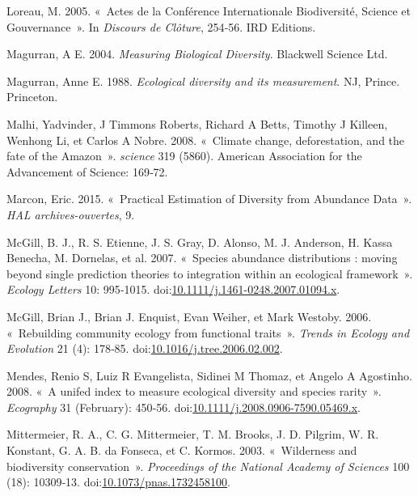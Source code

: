 \documentclass[11pt,french,A4paper,extrafontsizes,onecolumn,openright]{memoir}
\begin{document}
\hypertarget{ref-Loreau2005}{}
Loreau, M. 2005. «~Actes de la Conférence Internationale Biodiversité,
Science et Gouvernance~». In \emph{Discours de Clôture}, 254‑56. IRD
Editions.

\hypertarget{ref-Magurran2004}{}
Magurran, A E. 2004. \emph{Measuring Biological Diversity}. Blackwell
Science Ltd.

\hypertarget{ref-Magurran1988}{}
Magurran, Anne E. 1988. \emph{Ecological diversity and its measurement}.
NJ, Prince. Princeton.

\hypertarget{ref-Malhi2008}{}
Malhi, Yadvinder, J Timmons Roberts, Richard A Betts, Timothy J Killeen,
Wenhong Li, et Carlos A Nobre. 2008. «~Climate change, deforestation,
and the fate of the Amazon~». \emph{science} 319 (5860). American
Association for the Advancement of Science: 169‑72.

\hypertarget{ref-Marcon2015b}{}
Marcon, Eric. 2015. «~Practical Estimation of Diversity from Abundance
Data~». \emph{HAL archives-ouvertes}, 9.

\hypertarget{ref-McGill2007}{}
McGill, B. J., R. S. Etienne, J. S. Gray, D. Alonso, M. J. Anderson, H.
Kassa Benecha, M. Dornelas, et al. 2007. «~Species abundance
distributions : moving beyond single prediction theories to integration
within an ecological framework~». \emph{Ecology Letters} 10: 995‑1015.
doi:\href{https://doi.org/10.1111/j.1461-0248.2007.01094.x}{10.1111/j.1461-0248.2007.01094.x}.

\hypertarget{ref-McGill2006}{}
McGill, Brian J., Brian J. Enquist, Evan Weiher, et Mark Westoby. 2006.
«~Rebuilding community ecology from functional traits~». \emph{Trends in
Ecology and Evolution} 21 (4): 178‑85.
doi:\href{https://doi.org/10.1016/j.tree.2006.02.002}{10.1016/j.tree.2006.02.002}.

\hypertarget{ref-Mendes2008}{}
Mendes, Renio S, Luiz R Evangelista, Sidinei M Thomaz, et Angelo A
Agostinho. 2008. «~A unifed index to measure ecological diversity and
species rarity~». \emph{Ecography} 31 (February): 450‑56.
doi:\href{https://doi.org/10.1111/j.2008.0906-7590.05469.x}{10.1111/j.2008.0906-7590.05469.x}.

\hypertarget{ref-Mittermeier2003}{}
Mittermeier, R. A., C. G. Mittermeier, T. M. Brooks, J. D. Pilgrim, W.
R. Konstant, G. A. B. da Fonseca, et C. Kormos. 2003. «~Wilderness and
biodiversity conservation~». \emph{Proceedings of the National Academy
of Sciences} 100 (18): 10309‑13.
doi:\href{https://doi.org/10.1073/pnas.1732458100}{10.1073/pnas.1732458100}.
\end{document}
